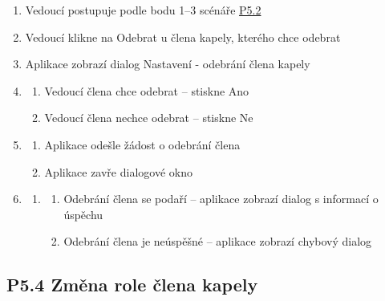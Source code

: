 \begin{enumerate}
    \item Vedoucí postupuje podle bodu 1--3 scénáře \hyperref[P5.2]{P5.2}
    \item Vedoucí klikne na Odebrat u člena kapely, kterého chce odebrat
    \item Aplikace zobrazí dialog Nastavení - odebrání člena kapely
    \item \begin{enumerate}
        \item Vedoucí člena chce odebrat -- stiskne Ano
        \item Vedoucí člena nechce odebrat -- stiskne Ne
    \end{enumerate}
    \item \begin{enumerate}
        \item Aplikace odešle žádost o odebrání člena
        \item Aplikace zavře dialogové okno
    \end{enumerate}
    \item \begin{enumerate}
        \item \begin{enumerate}
            \item Odebrání člena se podaří -- aplikace zobrazí dialog s informací o úspěchu
            \item Odebrání člena je neúspěšné -- aplikace zobrazí chybový dialog
        \end{enumerate}
    \end{enumerate}
\end{enumerate}

\subsection{P5.4 Změna role člena kapely}
\label{P5.4}

